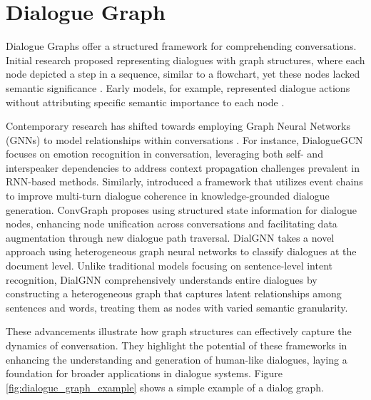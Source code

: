 
\section{Dialogue Graph}
Dialogue Graphs offer a structured framework for comprehending conversations. Initial research proposed representing dialogues with graph structures, where each node depicted a step in a sequence, similar to a flowchart, yet these nodes lacked semantic significance \cite{agarwal-rajeev-1997-towards} \cite{denecke-matthias-2002-rapid} \cite{schlungbaum-elwert-1996-dialogue}. Early models, for example, represented dialogue actions without attributing specific semantic importance to each node \cite{aust-oerder-1995-dialogue} \cite{wrnestl-2005-modeling}.

Contemporary research has shifted towards employing Graph Neural Networks (GNNs) to model relationships within conversations \cite{scarselli-etal-2009-gnn}. For instance, DialogueGCN \cite{ghosal-etal-2019-dialoguegcn} focuses on emotion recognition in conversation, leveraging both self- and interspeaker dependencies to address context propagation challenges prevalent in RNN-based methods. Similarly, \cite{xu-etal-2020-dialog} introduced a framework that utilizes event chains to improve multi-turn dialogue coherence in knowledge-grounded dialogue generation. ConvGraph \cite{gritta-etal-2021-conversation} proposes using structured state information for dialogue nodes, enhancing node unification across conversations and facilitating data augmentation through new dialogue path traversal. DialGNN \cite{yan-etal-2024-dialgnn} takes a novel approach using heterogeneous graph neural networks to classify dialogues at the document level. Unlike traditional models focusing on sentence-level intent recognition, DialGNN comprehensively understands entire dialogues by constructing a heterogeneous graph that captures latent relationships among sentences and words, treating them as nodes with varied semantic granularity.

These advancements illustrate how graph structures can effectively capture the dynamics of conversation. They highlight the potential of these frameworks in enhancing the understanding and generation of human-like dialogues, laying a foundation for broader applications in dialogue systems. Figure \ref{fig:dialogue_graph_example} shows a simple example of a dialog graph.

